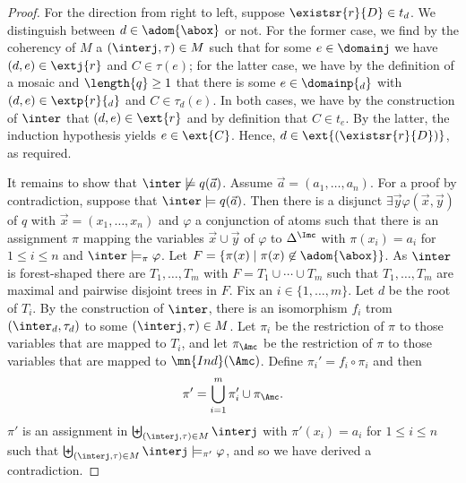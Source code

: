 \documentclass{lmcs}
\theoremstyle{definition}
\begin{document}
\begin{proof}
    For the direction from right to left, suppose $\existsr{r}{D}\in
    t_d$. We distinguish between $d\in\adom{\abox}$ or not. For the
    former case, we find by the coherency of $M$ a $(\interj,\tau)\in
    M$ such that for some $e\in\domainj$ we have $(d,e)\in\extj{r}$
    and $C\in\tau(e)$; for the latter case, we have by the definition
    of a mosaic and $\length{q}\geq 1$ that there is some
    $e\in\domainp{_d}$ with $(d,e)\in\extp{r}{_d}$ and
    $C\in\tau_d(e)$. In both cases, we have by the construction of
    $\inter$ that $(d,e)\in\ext{r}$ and by definition that $C\in
    t_e$. By the latter, the induction hypothesis yields
    $e\in\ext{C}$. Hence, $d\in\ext{(\existsr{r}{D})}$, as required.

\smallskip

  It remains to show that $\inter\not\models q(\vec{a})$. Assume $\vec{a}=(a_{1},\ldots,a_{n})$. For a proof by contradiction, 
  suppose that $\inter\models q(\vec{a})$. Then there is a disjunct 
  $\exists \vec{y}\varphi(\vec{x},\vec{y})$ of $q$ with $\vec{x}=(x_{1},\ldots,x_{n})$ and $\varphi$ a conjunction of
  atoms such that there is an assignment $\pi$ mapping the variables $\vec{x}\cup\vec{y}$ of $\varphi$ to $\Delta^{\Imc}$ 
  with $\pi(x_{i})=a_{i}$ for $1\leq i \leq n$ and $\inter \models_{\pi} \varphi$. Let $F=\{ \pi(x) \mid \pi (x)\not\in\adom{\abox}\}$.
  As $\inter$ is forest-shaped there are $T_1,\ldots,T_m$ with $F=T_{1}\cup \cdots \cup T_{m}$
  such that $T_{1},\ldots,T_{m}$ are maximal and pairwise disjoint trees in $F$.
  Fix an $i\in\{1,\ldots,m\}$. Let $d$ be the root of $T_i$. By the
  construction of $\inter$, there is an isomorphism $f_{i}$ trom $(\inter_d,\tau_d)$ to some $(\interj,\tau)\in M$. 
  Let $\pi_{i}$ be the restriction of $\pi$ to those variables that are mapped to $T_{i}$, and let $\pi_{\Amc}$ be the restriction of $\pi$
  to those variables that are mapped to $\mn{Ind}(\Amc)$. Define
  $\pi_{i}'=f_i\circ \pi_{i}$ and then
  $$
  \pi'=\bigcup^m_{i=1}\pi_i'\cup \pi_{\Amc}.
  $$
  $\pi'$ is an assignment in $\biguplus_{(\interj,\tau)\in M}\interj$ with $\pi'(x_{i})=a_{i}$ for $1\leq i \leq n$
  such that $\biguplus_{(\interj,\tau)\in M}\interj\models_{\pi'} \varphi$, and so we have derived a contradiction.
\end{proof}
\end{document}
